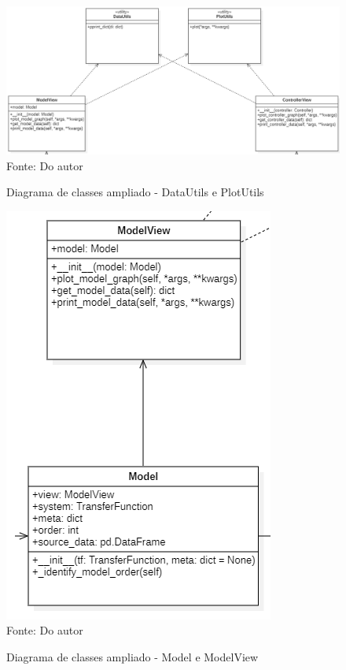 \begin{figure}[H]
    \centering
    \caption{Diagrama de classes ampliado - DataUtils e PlotUtils}
    \includegraphics[scale=0.6]{figuras/class_diag_dupu}
    \label{fig:class_diag_dupu}
    \\
    \vspace{0cm}\hspace{0cm}\small{Fonte: Do autor}
\end{figure}

\begin{figure}[H]
    \centering
    \caption{Diagrama de classes ampliado - Model e ModelView}
    \includegraphics[scale=0.7]{figuras/class_diag_model}
    \label{fig:class_diag_model}
    \\
    \vspace{0cm}\hspace{0cm}\small{Fonte: Do autor}
\end{figure}

